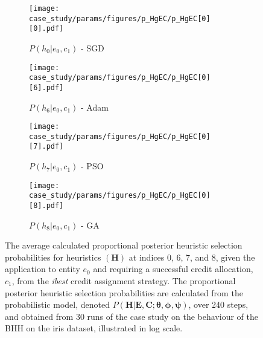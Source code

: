 \begin{figure}[htb]
      \begin{subfigure}{0.5\textwidth}
            \centering
            \texttt{[image: case\_study/params/figures/p\_HgEC/p\_HgEC[0][0].pdf]}
            \caption{$P(h_{0} \vert e_{0}, c_{1})$ - \acs{SGD}}
            \label{fig:results:case_study:p_HgEC:0:0}
      \end{subfigure}
      \begin{subfigure}{0.5\textwidth}
            \centering
            \texttt{[image: case\_study/params/figures/p\_HgEC/p\_HgEC[0][6].pdf]}
            \caption{$P(h_{6} \vert e_{0}, c_{1})$ - \acs{Adam}}
            \label{fig:results:case_study:p_HgEC:0:6}
      \end{subfigure}
      \par\bigskip
      \begin{subfigure}{0.5\textwidth}
            \centering
            \texttt{[image: case\_study/params/figures/p\_HgEC/p\_HgEC[0][7].pdf]}
            \caption{$P(h_{7} \vert e_{0}, c_{1})$ - \acs{PSO}}
            \label{fig:results:case_study:p_HgEC:0:7}
      \end{subfigure}
      \begin{subfigure}{0.5\textwidth}
            \centering
            \texttt{[image: case\_study/params/figures/p\_HgEC/p\_HgEC[0][8].pdf]}
            \caption{$P(h_{8} \vert e_{0}, c_{1})$ - \acs{GA}}
            \label{fig:results:case_study:p_HgEC:0:8}
      \end{subfigure}
      \par\bigskip
      \caption{The average calculated proportional posterior heuristic selection probabilities for heuristics $(\boldsymbol{H})$ at indices 0, 6, 7, and 8, given the application to entity $e_{0}$ and requiring a successful credit allocation, $c_{1}$, from the \textit{ibest} credit assignment strategy. The proportional posterior heuristic selection probabilities are calculated from the probabilistic model, denoted $P(\boldsymbol{H} \vert \boldsymbol{E}, \boldsymbol{C}; \boldsymbol{\theta}, \boldsymbol{\phi}, \boldsymbol{\psi})$, over 240 steps, and obtained from 30 runs of the case study on the behaviour of the \acs{BHH} on the iris dataset, illustrated in log scale.}
      \label{fig:results:case_study:p_HgEC:0}
\end{figure}

